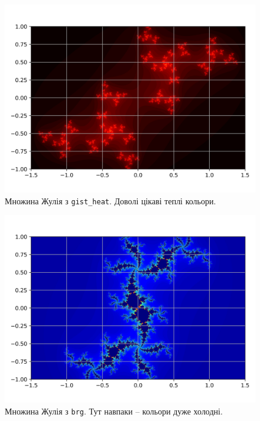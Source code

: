 \documentclass[oneside,solution]{tmpl}
\begin{document}
\begin{figure}
    \centering
    \includegraphics[width=\textwidth]{images/hw_10/julia_1.jpg}
    \caption{Множина Жулія з \texttt{gist\_heat}. Доволі цікаві теплі кольори.}
    \label{fig:1}
\end{figure}

\begin{figure}
    \centering
    \includegraphics[width=\textwidth]{images/hw_10/julia_2.jpg}
    \caption{Множина Жулія з \texttt{brg}. Тут навпаки -- кольори дуже холодні.}
    \label{fig:2}
\end{figure}
\end{document}
